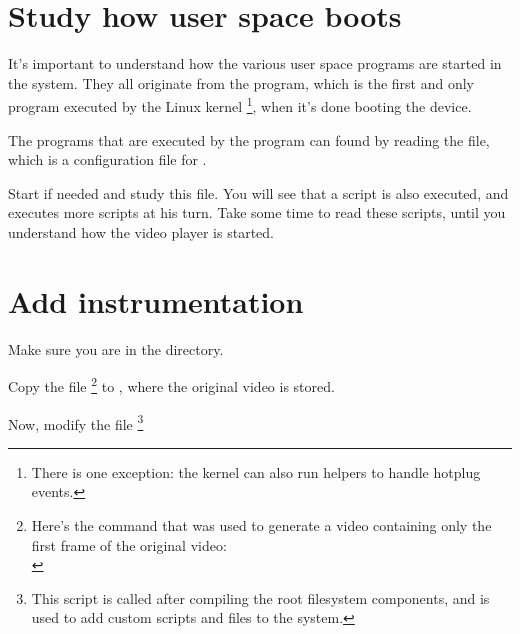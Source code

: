 \section{Study how user space boots}

It's important to understand how the various user space programs
are started in the system. They all originate from the 
program, which is the first and only program executed by the Linux
kernel \footnote{There is one exception: the kernel can also run
helpers to handle hotplug events.}, when it's done booting the device.

The programs that are executed by the  program can
found by reading the  file, which is a configuration
file for .

Start  if needed and study this file. You will see that
a  script is also executed, and executes more
scripts at his turn. Take some time to read these scripts, until you
understand how the video player is started.

\section{Add instrumentation}

Make sure you are in the  directory.

Copy the  file
\footnote {Here's the command that was used to generate a video
containing only the first frame of the original video: \\
}
to , where the original video is
stored.

Now, modify the  file
\footnote{This script is called after compiling the root filesystem
components, and is used to add custom scripts and files to the system.}

